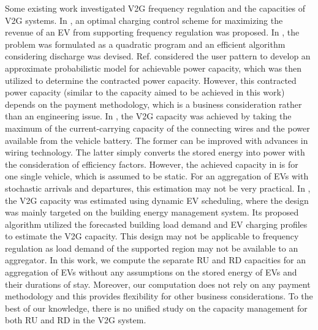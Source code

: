 \documentclass[journal]{IEEEtran}
\begin{document}
Some existing work investigated V2G frequency regulation and the capacities of V2G systems.
In \cite{optimal_aggregator}, an optimal charging control scheme for maximizing the revenue of an EV from supporting frequency regulation was proposed.  
In \cite{V2G_QP}, the problem was formulated as a quadratic program and an efficient algorithm considering discharge was devised.
Ref. \cite{estimation_capacity} considered the user pattern to develop an approximate probabilistic model for achievable power capacity, which was then utilized to determine the contracted power capacity.
However, this contracted power capacity (similar to the capacity aimed to be achieved in this work) depends on the payment methodology, which is a business consideration rather than an engineering issue.  
In \cite{V2G_fundamentals}, the V2G capacity was achieved by taking the maximum of the current-carrying capacity of the connecting wires and the power available from the vehicle battery.  The former can be improved with advances in wiring technology. The latter simply converts the stored energy into power with the consideration of efficiency factors.
However, the achieved capacity in \cite{V2G_fundamentals} is for one single vehicle, which is assumed to be static. For an aggregation of EVs with stochastic arrivals and departures, this estimation may not be very practical.
In \cite{V2GCap_dynamicEV}, the V2G capacity was estimated using dynamic EV scheduling, where the design was mainly targeted on the building energy management system. Its proposed algorithm utilized  the forecasted building load demand and EV charging profiles to estimate the V2G capacity. This design may not be applicable to frequency regulation as load demand of the supported region may not be available to an aggregator.
In this work, we  compute the separate RU and RD capacities for an aggregation of EVs without any assumptions on the stored energy of EVs and their durations of stay. Moreover, our computation does not  rely on any payment methodology and this provides flexibility for other business considerations.
To the best of our knowledge, there is no unified study on the capacity management for both RU and RD in the V2G system.
\end{document}
